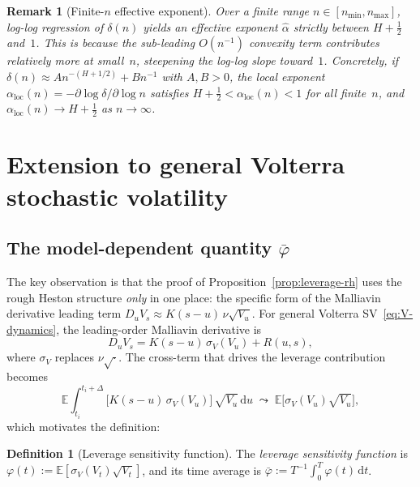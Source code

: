 \documentclass[12pt]{article}
\newtheorem{remark}{Remark}
\theoremstyle{definition}
\newtheorem{definition}[theorem]{Definition}
\newcommand{\E}{\mathbb{E}}
\newcommand{\dd}{\mathrm{d}}
\begin{document}
\begin{remark}[Finite-$n$ effective exponent]\label{rem:effective-alpha}
Over a finite range $n \in [n_{\min}, n_{\max}]$, log-log
regression of $\delta(n)$ yields an effective exponent
$\hat\alpha$ strictly between $H + \tfrac12$ and~$1$.
This is because the sub-leading $O(n^{-1})$ convexity term
contributes relatively more at small~$n$, steepening the
log-log slope toward~$1$.
Concretely, if $\delta(n) \approx A n^{-(H+1/2)} + B n^{-1}$
with $A, B > 0$, the local exponent
$\alpha_{\mathrm{loc}}(n) =
-\partial\log\delta / \partial\log n$ satisfies
$H + \tfrac12 < \alpha_{\mathrm{loc}}(n) < 1$ for all
finite~$n$, and
$\alpha_{\mathrm{loc}}(n) \to H + \tfrac12$ as
$n \to \infty$.
\end{remark}

\section{Extension to general Volterra stochastic volatility}
\label{sec:general}

\subsection{The model-dependent quantity $\bar\varphi$}

The key observation is that the proof of
Proposition~\ref{prop:leverage-rh} uses the rough Heston structure
\emph{only} in one place: the specific form of the Malliavin
derivative leading term $D_u V_s \approx K(s{-}u)\,\nu\sqrt{V_u}$.
For general Volterra SV~\eqref{eq:V-dynamics}, the leading-order
Malliavin derivative is
\begin{equation}\label{eq:DuVs-general}
  D_u V_s = K(s{-}u)\,\sigma_V(V_u) + R(u,s),
\end{equation}
where $\sigma_V$ replaces $\nu\sqrt{\cdot}$.
The cross-term that drives the leverage contribution becomes
\begin{equation}\label{eq:cross-term-general}
  \E\!\int_{t_i}^{t_i+\Delta}\!
  \bigl[K(s{-}u)\,\sigma_V(V_u)\bigr]\,\sqrt{V_u}\,\dd u
  \;\leadsto\;
  \E\bigl[\sigma_V(V_u)\sqrt{V_u}\bigr],
\end{equation}
which motivates the definition:

\begin{definition}[Leverage sensitivity function]
\label{def:varphi}
The \emph{leverage sensitivity function} is
$\varphi(t) := \E[\sigma_V(V_t)\sqrt{V_t}]$,
and its time average is
$\bar\varphi := T^{-1}\!\int_0^T\!\varphi(t)\,\dd t$.
\end{definition}
\end{document}
